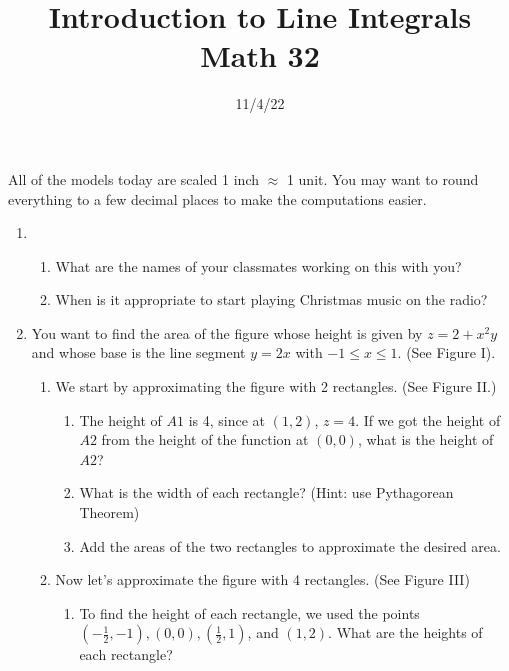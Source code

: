 \documentclass[12pt]{amsart}
\title[]{Introduction to Line Integrals\\Math 32}
\author[]{11/4/22}
\begin{document}
\phantom{x}
\vspace{-0.5in}
\maketitle

All of the models today are scaled 1 inch $\approx$ 1 unit.  You may want to round everything to a few decimal places to make the computations easier.

\begin{enumerate}
\item
\begin{enumerate}
\item
What are the names of your classmates working on this with you?

\vspace{0.5in}
\item
When is it appropriate to start playing Christmas music on the radio?

\vspace{0.5in}
\end{enumerate}
\item
You want to find the area of the figure whose height is given by $z=2+x^2y$ and whose base is the line segment $y=2x$ with $-1 \le x \le 1$.  (See Figure I).
\begin{enumerate}
\item
We start by approximating the figure with 2 rectangles.  (See Figure II.)
\begin{enumerate}
\item
The height of $A1$ is 4, since  at $(1,2)$, $z= 4$.  If we got the height of $A2$ from the height of the function at $(0,0)$, what is the height of $A2$?

\vspace{.5in}
\item
What is the width of each rectangle? (Hint: use Pythagorean Theorem)

\vspace{.5in}
\item
Add the areas of the two rectangles to approximate the desired area.

\vspace{.5in}
\end{enumerate}
\item
Now let's approximate the figure with 4 rectangles.  (See Figure III)
\begin{enumerate}
\item
To find the height of each rectangle, we used the points $(-\frac12,-1), (0,0), (\frac12,1)$, and $(1,2)$.  What are the heights of each rectangle?


\end{enumerate}
\end{enumerate}
\end{enumerate}
\end{document}
